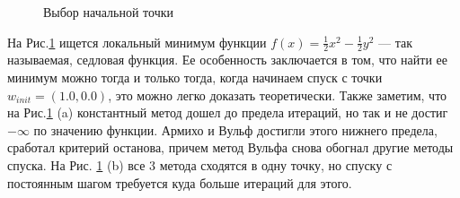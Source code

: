 \documentclass{article}
\begin{document}
	\vspace{1cm}
	
	\begin{figure}[H]
		\centering
		\hfill %
		\caption{Выбор начальной точки}
		\label{fig:start_point}
	\end{figure}
	
	На Рис.\ref{fig:start_point} ищется локальный минимум функции $f(x) = \frac{1}{2}x^2 - \frac{1}{2}y^2$ --- так называемая, седловая функция. Ее особенность заключается в том, что найти ее минимум можно тогда и только тогда, когда начинаем спуск с точки $w_{init} = (1.0, 0.0)$, это можно легко доказать теоретически. Также заметим, что на Рис.\ref{fig:start_point} (a) константный метод дошел до предела итераций, но так и не достиг $-\infty$ по значению функции. Армихо и Вульф достигли этого нижнего предела, сработал критерий останова, причем метод Вульфа снова обогнал другие методы спуска. На Рис. \ref{fig:start_point} (b) все 3 метода сходятся в одну точку, но спуску с постоянным шагом требуется куда больше итераций для этого.
	
\end{document}
